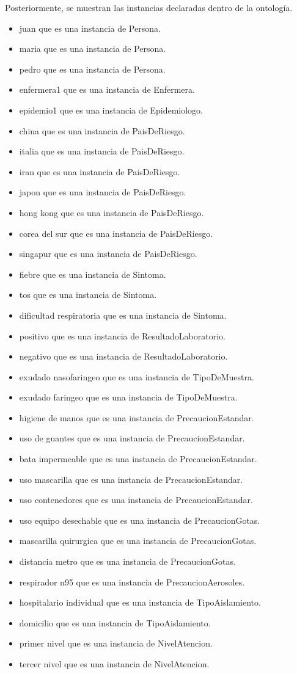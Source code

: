 \documentclass[11pt, letterpaper]{article}
\begin{document}
Posteriormente, se muestran las instancias declaradas dentro de la ontología.


\begin{itemize}
	\item juan que es una instancia de Persona.
	\item maria que es una instancia de Persona.
	\item pedro que es una instancia de Persona.
	\item enfermera1 que es una instancia de Enfermera.
	\item epidemio1 que es una instancia de Epidemiologo.
	\item china que es una instancia de PaisDeRiesgo.
	\item italia que es una instancia de PaisDeRiesgo.
	\item iran que es una instancia de PaisDeRiesgo.
	\item japon que es una instancia de PaisDeRiesgo.
	\item hong kong que es una instancia de PaisDeRiesgo.
	\item corea del sur que es una instancia de PaisDeRiesgo.
	\item singapur que es una instancia de PaisDeRiesgo.
	\item fiebre que es una instancia de Sintoma.
	\item tos que es una instancia de Sintoma.
	\item dificultad respiratoria que es una instancia de Sintoma.
	\item positivo que es una instancia de ResultadoLaboratorio.
	\item negativo que es una instancia de ResultadoLaboratorio.
	\item exudado nasofaringeo que es una instancia de TipoDeMuestra.
	\item exudado faringeo que es una instancia de TipoDeMuestra.
	\item higiene de manos que es una instancia de PrecaucionEstandar.
	\item uso de guantes que es una instancia de PrecaucionEstandar.
	\item bata impermeable que es una instancia de PrecaucionEstandar.
	\item uso mascarilla que es una instancia de PrecaucionEstandar.
	\item uso contenedores que es una instancia de PrecaucionEstandar.
	\item uso equipo desechable que es una instancia de PrecaucionGotas.
	\item mascarilla quirurgica que es una instancia de PrecaucionGotas.
	\item distancia metro que es una instancia de PrecaucionGotas.
	\item respirador n95 que es una instancia de PrecaucionAerosoles.
	\item hospitalario individual que es una instancia de TipoAislamiento.
	\item domicilio que es una instancia de TipoAislamiento.
	\item primer nivel que es una instancia de NivelAtencion.
	\item tercer nivel que es una instancia de NivelAtencion.


\end{itemize}
\end{document}
